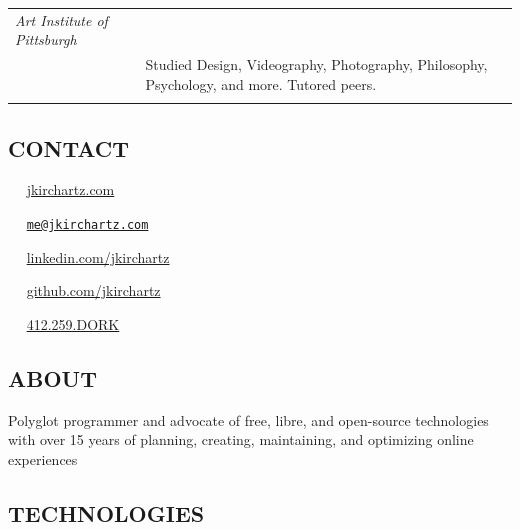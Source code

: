 \documentclass[]{article}
\def\envelope{{\FA \faEnvelope}}
\def\linkedin{{\FA \faLinkedin}}
\def\github{{\FA \faGithub}}
\def\phone{{\FA \faPhone}}
\def\globe{{\FA \faGlobe}}
\begin{document}
\begin{multicols}{2}
\begin{longtable}[c]{@{}ll@{}}
\begin{minipage}[t]{0.74\columnwidth}
\emph{Art Institute of Pittsburgh}
\strut\end{minipage}\tabularnewline
\begin{minipage}[t]{0.20\columnwidth}\raggedright\strut
\strut\end{minipage} &
\begin{minipage}[t]{0.74\columnwidth}\raggedright\strut
\color{grey} Studied Design, Videography, Photography, Philosophy,
Psychology, and more. Tutored peers.
\strut\end{minipage}\tabularnewline
\begin{minipage}[t]{0.20\columnwidth}\raggedright\strut
\strut\end{minipage} &
\begin{minipage}[t]{0.74\columnwidth}\raggedright\strut
\strut\end{minipage}\tabularnewline
\bottomrule
\end{longtable}

\columnbreak

\subsection{\texorpdfstring{\color{blue}
CONTACT}{ CONTACT}}\label{contact}

\color{blue} \globe ~~ \href{http://jkirchartz.com}{jkirchartz.com}

\color{blue} \envelope ~~
\href{mailto:me@jkirchartz.com}{\nolinkurl{me@jkirchartz.com}}

\color{blue} \linkedin ~~
\href{http://linkedin.com/jkirchartz}{linkedin.com/jkirchartz}

\color{blue} \github ~~
\href{http://github.com/jkirchartz}{github.com/jkirchartz}

\color{blue} \phone ~~ \href{tel:412-259-3675}{412.259.DORK}

\subsection{\texorpdfstring{\color{blue} ABOUT}{ ABOUT}}\label{about}

\color{grey} Polyglot programmer and advocate of free, libre, and
open-source technologies with over 15 years of planning, creating,
maintaining, and optimizing online experiences

\subsection{\texorpdfstring{\color{blue}
TECHNOLOGIES}{ TECHNOLOGIES}}\label{technologies}


\end{multicols}
\end{document}
